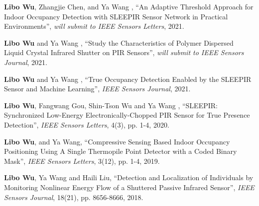 

\begin{cvparagraph}

    \vspace{12pt}
    \begin{cvitems}
    \setlength{\itemsep}{2pt}
    \item{
        \textbf{Libo Wu}{, Zhangjie Chen, and Ya Wang , ``An Adaptive Threshold Approach for Indoor Occupancy Detection with SLEEPIR Sensor Network in Practical Environments'', \textit{will submit to IEEE Sensors Letters}, 2021.}}
     
    \item{
        \textbf{Libo Wu}{ and Ya Wang , ``Study the Characteristics of Polymer Dispersed Liquid Crystal Infrared Shutter on PIR Sensors'', \textit{will submit to IEEE Sensors Journal}, 2021.}}
      
    \item{
        \textbf{Libo Wu}{ and Ya Wang , ``True Occupancy Detection Enabled by the SLEEPIR Sensor and Machine Learning'', \textit{IEEE Sensors Journal}, 2021.}}
      
    \item{
        \textbf{Libo Wu}{, Fangwang Gou, Shin-Tson Wu and Ya Wang , ``SLEEPIR: Synchronized Low-Energy Electronically-Chopped PIR Sensor for True Presence Detection'', \textit{IEEE Sensors Letters}, 4(3), pp. 1-4, 2020.}}
        
    \item{
        \textbf{Libo Wu}{, and Ya Wang, ``Compressive Sensing Based Indoor Occupancy Positioning Using A Single Thermopile Point Detector with a Coded Binary Mask'', \textit{IEEE Sensors Letters}, 3(12), pp. 1-4, 2019.}}
  
    \item{
        \textbf{Libo Wu}{, Ya Wang and Haili Liu, ``Detection and Localization of Individuals by Monitoring Nonlinear Energy Flow of a Shuttered Passive Infrared Sensor'', \textit{IEEE Sensors Journal}, 18(21), pp. 8656-8666, 2018.}}
  

\end{cvitems}
\end{cvparagraph}
